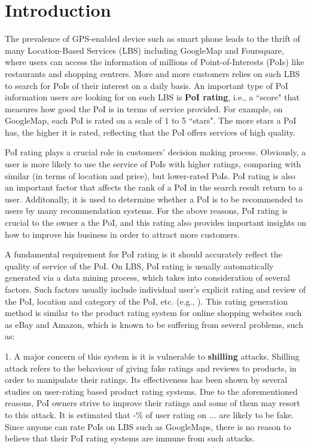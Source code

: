 \section{Introduction}\label{sec:intro}

The prevalence of GPS-enabled device such as  smart phone leads to the thrift of many Location-Based Services (LBS) including GoogleMap and Foursquare, where users can access the information of millions of Point-of-Interests (PoIs) like restaurants and shopping centrers. More and more customers relies on such LBS to search for PoIs of their interest on a daily basis. An important type of PoI information users are looking for on such LBS is \textbf{PoI rating}, i.e., a ``score" that measures how good the PoI is in terms of service provided. For example, on GoogleMap, each PoI is rated on a scale of 1 to 5 ``stars". The more stars a PoI has, the higher it is rated, reflecting that the PoI offers services of high quality.

PoI rating plays a crucial role in customers' decision making process. Obviously, a user is more likely to use the service of PoIs with higher ratings, comparing with similar (in terms of location and price), but lower-rated PoIs. PoI rating is also an important factor that affects the rank of a PoI in the search result return to a user. Additonally, it is used to determine whether a PoI is to be recommended to users by many recommendation systems. For the above reasons, PoI rating is crucial to the owner a the PoI, and this rating also provides important insights on how to improve his business in order to attract more customers.

A fundamental requirement for PoI rating is it should accurately reflect the quality of service of the PoI. On LBS, PoI rating is usually automatically generated via a data mining process, which takes into consideration of several factors. Such factors usually include individual user's explicit rating and review of the PoI, location and category of the PoI, etc. (e.g., ). This rating generation method is similar to the product rating system for online shopping websites such as eBay and Amazon, which is known to be suffering from several problems, such as:

1. A major concern of this system is it is vulnerable to \textbf{shilling} attacks. Shilling attack refers to the behaviour of giving fake ratings and reviews to products, in order to manipulate their ratings. Its effectiveness has been shown by several studies on user-rating based product rating systems. Due to the aforementioned reasons, PoI owners strive to improve their ratings and some of them may resort to this attack. It is estimated that -\% of user rating on ... are likely to be fake. Since anyone can rate PoIs on LBS such as GoogleMaps, there is no reason to believe that their PoI rating systems are immune from such attacks. 

